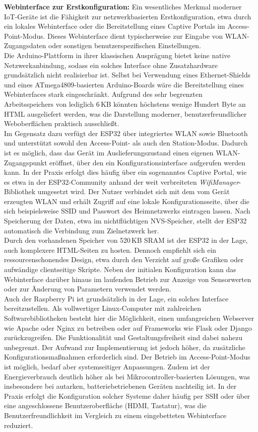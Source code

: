 \noindent\textbf{Webinterface zur Erstkonfiguration:} Ein wesentliches Merkmal moderner IoT-Geräte ist die Fähigkeit zur netzwerkbasierten Erstkonfiguration, etwa durch ein lokales Webinterface oder die Bereitstellung eines Captive Portals im Access-Point-Modus. Dieses Webinterface dient typischerweise zur Eingabe von WLAN-Zugangsdaten oder sonstigen benutzerspezifischen Einstellungen.
\\
Die Arduino-Plattform in ihrer klassischen Ausprägung bietet keine native Netzwerkanbindung, sodass ein solches Interface ohne Zusatzhardware grundsätzlich nicht realisierbar ist. Selbst bei Verwendung eines Ethernet-Shields und eines ATmega4809-basierten Arduino-Boards wäre die Bereitstellung eines Webinterfaces stark eingeschränkt. Aufgrund des sehr begrenzten Arbeitsspeichers von lediglich 6\,KB könnten höchstens wenige Hundert Byte an HTML ausgeliefert werden, was die Darstellung moderner, benutzerfreundlicher Weboberflächen praktisch ausschließt.
\\
Im Gegensatz dazu verfügt der ESP32 über integriertes WLAN sowie Bluetooth und unterstützt sowohl den Access-Point- als auch den Station-Modus. Dadurch ist es möglich, dass das Gerät im Auslieferungszustand einen eigenen WLAN-Zugangspunkt eröffnet, über den ein Konfigurationsinterface aufgerufen werden kann. In der Praxis erfolgt dies häufig über ein sogenanntes Captive Portal, wie es etwa in der ESP32-Community anhand der weit verbreiteten \textit{WifiManager}-Bibliothek umgesetzt wird. Der Nutzer verbindet sich mit dem vom Gerät erzeugten WLAN und erhält Zugriff auf eine lokale Konfigurationsseite, über die sich beispielsweise SSID und Passwort des Heimnetzwerks eintragen lassen. Nach Speicherung der Daten, etwa im nichtflüchtigen NVS-Speicher, stellt der ESP32 automatisch die Verbindung zum Zielnetzwerk her.
\\
Durch den vorhandenen Speicher von 520\,KB SRAM ist der ESP32 in der Lage, auch komplexere HTML-Seiten zu hosten. Dennoch empfiehlt sich ein ressourcenschonendes Design, etwa durch den Verzicht auf große Grafiken oder aufwändige clientseitige Skripte. Neben der initialen Konfiguration kann das Webinterface darüber hinaus im laufenden Betrieb zur Anzeige von Sensorwerten oder zur Änderung von Parametern verwendet werden.
\\
Auch der Raspberry Pi ist grundsätzlich in der Lage, ein solches Interface bereitzustellen. Als vollwertiger Linux-Computer mit zahlreichen Softwarebibliotheken besteht hier die Möglichkeit, einen umfangreichen Webserver wie Apache oder Nginx zu betreiben oder auf Frameworks wie Flask oder Django zurückzugreifen. Die Funktionalität und Gestaltungsfreiheit sind dabei nahezu unbegrenzt. Der Aufwand zur Implementierung ist jedoch höher, da zusätzliche Konfigurationsmaßnahmen erforderlich sind. Der Betrieb im Access-Point-Modus ist möglich, bedarf aber systemseitiger Anpassungen. Zudem ist der Energieverbrauch deutlich höher als bei Mikrocontroller-basierten Lösungen, was insbesondere bei autarken, batteriebetriebenen Geräten nachteilig ist. In der Praxis erfolgt die Konfiguration solcher Systeme daher häufig per SSH oder über eine angeschlossene Benutzeroberfläche (HDMI, Tastatur), was die Benutzerfreundlichkeit im Vergleich zu einem eingebetteten Webinterface reduziert.
